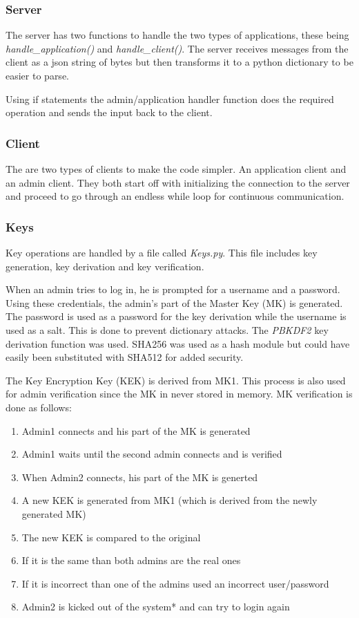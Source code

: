 \documentclass[a4paper, 12pt]{article}
\begin{document}
\subsubsection{Server}
The server has two functions to handle the two types of applications, these being \textit{handle\_application()} and \textit{handle\_client()}. The server receives messages from the client as a json string of bytes but then transforms it to a python dictionary to be easier to parse.
\par
Using if statements the admin/application handler function does the required operation and sends the input back to the client.

\subsubsection{Client}
The are two types of clients to make the code simpler. An application client and an admin client. 
They both start off with initializing the connection to the server and proceed to go through an endless while loop for continuous communication. 

\subsubsection{Keys}
Key operations are handled by a file called \textit{Keys.py}. This file includes key generation, key derivation and key verification.
\par
When an admin tries to log in, he is prompted for a username and a password. Using these credentials, the admin's part of the Master Key (MK) is generated. The password is used as a password for the key derivation while the username is used as a salt. This is done to prevent dictionary attacks. The \textit{PBKDF2} key derivation function was used. SHA256 was used as a hash module but could have easily been substituted with SHA512 for added security.
\par
The Key Encryption Key (KEK) is derived from MK1. This process is also used for admin verification since the MK in never stored in memory.
MK verification is done as follows:

\begin{enumerate}
   \item Admin1 connects and his part of the MK is generated
   \item Admin1 waits until the second admin connects and is verified
   \item When Admin2 connects, his part of the MK is generted
   \item A new KEK is generated from MK1 (which is derived from the newly generated MK)
   \item The new KEK is compared to the original
   \item If it is the same than both admins are the real ones
   \item If it is incorrect than one of the admins used an incorrect user/password
   \item Admin2 is kicked out of the system* and can try to login again
\end{enumerate}
\end{document}
